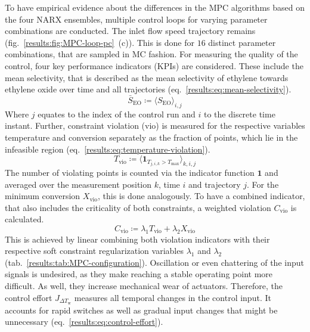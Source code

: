 To have empirical evidence about the differences in the MPC algorithms based on the four
NARX ensembles, multiple control loops for varying parameter combinations are conducted. 
The inlet flow speed trajectory remains (fig.~\ref{results:fig:MPC-loop-pc}~(c)). This is 
done for $16$ distinct parameter combinations, that are sampled in MC fashion.
For measuring the quality of the control, four key performance indicators (KPIs) are 
considered. These include the mean selectivity, that is described as the mean selectivity
of ethylene towards ethylene oxide over time and all trajectories (eq.~\ref{results:eq:mean-selectivity}).
\begin{equation}
    \label{results:eq:mean-selectivity}
    \bar{S}_\text{EO} \coloneq \langle S_\text{EO} \rangle_{i, j}
\end{equation}
Where $j$ equates to the index of the control run and $i$ to the discrete time instant.
Further, constraint violation (vio) is measured for the respective variables temperature and conversion
separately as the fraction of points, which lie in the infeasible region (eq.~\ref{results:eq:temperature-violation}). 
\begin{equation}
    \label{results:eq:temperature-violation}
    T_\text{vio} \coloneq \langle \bm{1}_{T_{j,i,k} > T_\text{max}} \rangle_{k, i, j}
\end{equation}
The number of violating points is counted via the indicator function $\bm{1}$ and averaged 
over the measurement position $k$, time $i$ and trajectory $j$. For the minimum conversion $X_\text{vio}$,
this is done analogously. To have a combined indicator, that also includes the criticality
of both constraints, a weighted violation $C_\text{vio}$ is calculated.
\begin{equation}
    \label{results:eq:combined-violation}
    C_\text{vio} \coloneq \lambda_1 T_\text{vio} + \lambda_2 X_\text{vio}
\end{equation}
This is achieved by linear combining both violation indicators with their respective
soft constraint
regularization variables $\lambda_1$ and $\lambda_2$ (tab.~\ref{results:tab:MPC-configuration}).
Oscillation or even chattering of the input signals is undesired, as they 
make reaching a stable operating point more difficult. As well, they increase mechanical wear
of actuators. 
Therefore, the control
effort $J_{\Delta T_\text{w}}$ measures all temporal changes in the control input. It accounts
for rapid switches as well as gradual input changes that might be unnecessary (eq.~\ref{results:eq:control-effort}).
